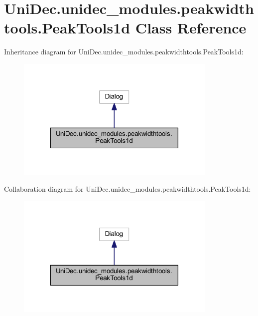 \hypertarget{class_uni_dec_1_1unidec__modules_1_1peakwidthtools_1_1_peak_tools1d}{}\section{Uni\+Dec.\+unidec\+\_\+modules.\+peakwidthtools.\+Peak\+Tools1d Class Reference}
\label{class_uni_dec_1_1unidec__modules_1_1peakwidthtools_1_1_peak_tools1d}


Inheritance diagram for Uni\+Dec.\+unidec\+\_\+modules.\+peakwidthtools.\+Peak\+Tools1d\+:\nopagebreak
\begin{figure}[H]
\begin{center}
\leavevmode
\includegraphics[width=272pt]{class_uni_dec_1_1unidec__modules_1_1peakwidthtools_1_1_peak_tools1d__inherit__graph}
\end{center}
\end{figure}


Collaboration diagram for Uni\+Dec.\+unidec\+\_\+modules.\+peakwidthtools.\+Peak\+Tools1d\+:\nopagebreak
\begin{figure}[H]
\begin{center}
\leavevmode
\includegraphics[width=272pt]{class_uni_dec_1_1unidec__modules_1_1peakwidthtools_1_1_peak_tools1d__coll__graph}
\end{center}
\end{figure}
